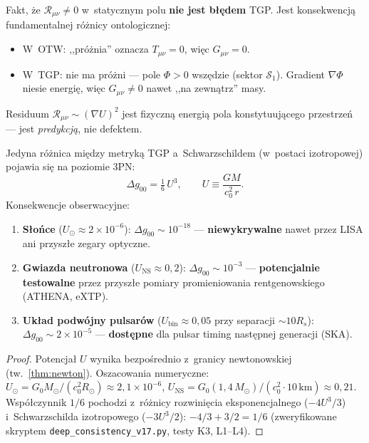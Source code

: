 \begin{remark}\label{rem:residuum}
Fakt, \.ze $\mathcal{R}_{\mu\nu} \neq 0$ w~statycznym polu
\textbf{nie jest b\l{}\k{e}dem} TGP. Jest konsekwencj\k{a}
fundamentalnej r\'o\.znicy ontologicznej:
\begin{itemize}[nosep]
  \item W~OTW: ,,pr\'o\.znia'' oznacza $T_{\mu\nu} = 0$,
    wi\k{e}c $G_{\mu\nu} = 0$.
  \item W~TGP: nie ma pr\'o\.zni --- pole $\Phi > 0$ wsz\k{e}dzie
    (sektor $\mathcal{S}_1$). Gradient $\nabla\Phi$ niesie
    energi\k{e}, wi\k{e}c $G_{\mu\nu} \neq 0$ nawet ,,na zewn\k{a}trz'' masy.
\end{itemize}
Residuum $\mathcal{R}_{\mu\nu} \sim (\nabla U)^2$ jest fizyczn\k{a}
energi\k{a} pola konstytuuj\k{a}cego przestrze\'n ---
jest \emph{predykcj\k{a}}, nie defektem.
\end{remark}

\begin{proposition}\label{prop:3PN-bounds}
Jedyna r\'o\.znica mi\k{e}dzy metryk\k{a} TGP a~Schwarzschildem (w~postaci
izotropowej) pojawia si\k{e} na poziomie 3PN:
\begin{equation}\label{eq:3PN-deviation}
  \Delta g_{00} = \tfrac{1}{6}\,U^3,
  \qquad U \equiv \frac{GM}{c_0^2\,r}.
\end{equation}
\noindent Konsekwencje obserwacyjne:
\begin{enumerate}[nosep]
  \item \textbf{S\l{}o\'nce} ($U_\odot \approx 2 \times 10^{-6}$):
    $\Delta g_{00} \sim 10^{-18}$ --- \textbf{niewykrywalne}
    nawet przez LISA ani przysz\l{}e zegary optyczne.
  \item \textbf{Gwiazda neutronowa} ($U_{\mathrm{NS}} \approx 0{,}2$):
    $\Delta g_{00} \sim 10^{-3}$ ---
    \textbf{potencjalnie testowalne} przez przysz\l{}e
    pomiary promieniowania rentgenowskiego (ATHENA, eXTP).
  \item \textbf{Uk\l{}ad podw\'ojny pulsar\'ow}
    ($U_{\mathrm{bin}} \approx 0{,}05$ przy separacji $\sim 10R_s$):
    $\Delta g_{00} \sim 2 \times 10^{-5}$ ---
    \textbf{dost\k{e}pne} dla pulsar timing nast\k{e}pnej generacji (SKA).
\end{enumerate}
\end{proposition}

\begin{proof}
Potencja\l{} $U$ wynika bezpo\'srednio z~granicy newtonowskiej
(tw.~\ref{thm:newton}). Oszacowania numeryczne:
$U_\odot = G_0 M_\odot/(c_0^2 R_\odot) \approx 2{,}1 \times 10^{-6}$,
$U_{\mathrm{NS}} = G_0 (1{,}4\,M_\odot)/(c_0^2 \cdot 10\,\mathrm{km})
\approx 0{,}21$. Wsp\'o\l{}czynnik $1/6$ pochodzi z~r\'o\.znicy
rozwinięcia eksponencjalnego ($-4U^3/3$)
i~Schwarzschilda izotropowego ($-3U^3/2$):
$-4/3 + 3/2 = 1/6$
(zweryfikowane skryptem \texttt{deep\_consistency\_v17.py}, testy K3, L1--L4).
\end{proof}

